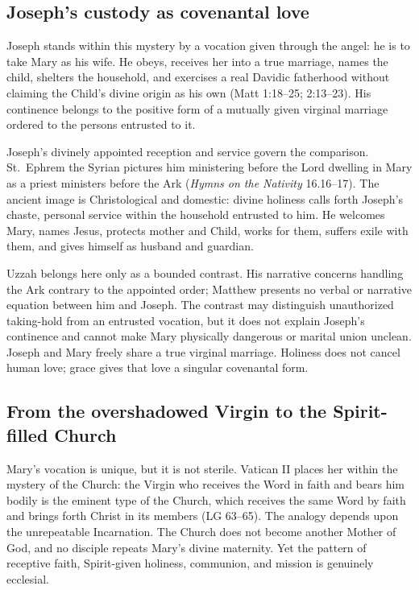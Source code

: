 \subsection{Joseph's custody as covenantal love}

Joseph stands within this mystery by a vocation given through the angel: he is
to take Mary as his wife.  He obeys, receives her into a true marriage, names
the child, shelters the household, and exercises a real Davidic fatherhood
without claiming the Child's divine origin as his own (Matt 1:18--25;
2:13--23).  His continence belongs to the positive form of a mutually given
virginal marriage ordered to the persons entrusted to it.

Joseph's divinely appointed reception and service govern the comparison.
St.~Ephrem the Syrian pictures him ministering before the Lord dwelling in
Mary as a priest ministers before the Ark (\emph{Hymns on the Nativity}
16.16--17).  The ancient image is Christological and domestic: divine holiness
calls forth Joseph's chaste, personal service within the household entrusted
to him.  He welcomes Mary, names Jesus, protects mother and Child, works for
them, suffers exile with them, and gives himself as husband and guardian.

Uzzah belongs here only as a bounded contrast.  His narrative concerns
handling the Ark contrary to the appointed order; Matthew presents no verbal
or narrative equation between him and Joseph.  The contrast may distinguish
unauthorized taking-hold from an entrusted vocation, but it does not explain
Joseph's continence and cannot make Mary physically dangerous or marital union
unclean.  Joseph and Mary freely share a true virginal marriage.  Holiness
does not cancel human love; grace gives that love a singular covenantal form.

\subsection{From the overshadowed Virgin to the Spirit-filled Church}

Mary's vocation is unique, but it is not sterile.  Vatican II places her within
the mystery of the Church: the Virgin who receives the Word in faith and bears
him bodily is the eminent type of the Church, which receives the same Word by
faith and brings forth Christ in its members (LG 63--65).  The analogy depends
upon the unrepeatable Incarnation.  The Church does not become another Mother
of God, and no disciple repeats Mary's divine maternity.  Yet the pattern of
receptive faith, Spirit-given holiness, communion, and mission is genuinely
ecclesial.

